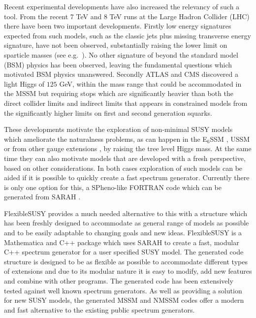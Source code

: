\documentclass[final,3p,11pt,pdflatex]{elsarticle}
\makeatletter
\newcommand{\sarah}{SARAH\@\xspace}
\newcommand{\fs}{FlexibleSUSY\@\xspace}
\newcommand{\mathematica}{Mathematica\xspace}
\newcommand{\ESSM}{E$_6$SSM\@\xspace}
\makeatother
\begin{document}
Recent experimental developments have also increased the relevancy of
such a tool. From the recent $7$ TeV and $8$ TeV runs at the Large
Hadron Collider (LHC) there have been two important developments.
Firstly low energy signatures expected from such models, such as the
classic jets plus missing transverse energy signature, have not been
observed, substantially raising the lower limit on sparticle masses
(see e.g.~\cite{Aad:2013wta,Chatrchyan:2014lfa}). No other signature
of beyond the standard model (BSM) physics has been observed, leaving
the fundamental questions which motivated BSM physics
unanswered. Secondly ATLAS and CMS discovered \cite{ATLAS:2012ae,
  Chatrchyan:2012tx} a light Higgs of $125$ GeV, within the mass range
that could be accommodated in the MSSM but requiring stops which are
significantly heavier than both the direct collider limits and
indirect limits that appears in constrained models from the
significantly higher limits on first and second generation squarks.

These developments motivate the exploration of non-minimal SUSY models
which ameliorate the naturalness problems, as can happen in the \ESSM
\cite{King:2005jy,King:2005my,King:2007uj,Athron:2010zz,Nevzorov:2012hs,Nevzorov:2013tta,Nevzorov:2013ixa}, USSM
\cite{Fayet:1977yc,Suematsu:1994qm,Cvetic:1995rj,deCarlos:1997yv,Cvetic:1997ky,Demir:1998dk,Langacker:1998tc,Erler:2002pr,Choi:2006fz,Ham:2007wc,Langacker:2008yv,Ham:2008xf,Kalinowski:2008iq} or from other gauge extensions \cite{Batra:2003nj, Medina:2009ey, Bharucha:2013ela}, 
by raising the tree level Higgs mass. At the same time they can also
motivate models that are developed with a fresh perspective, based on
other considerations.  In both cases exploration of such models can be
aided if it is possible to quickly create a fast spectrum generator.
Currently there is only one option for this, a SPheno-like FORTRAN
code which can be generated from \sarah
\cite{Staub:2010ty,Staub:2009bi,Staub:2010jh,Staub:2012pb,Staub:2013tta}.

\fs provides a much needed alternative to this with a structure which
has been freshly designed to accommodate as general range of models as
possible and to be easily adaptable to changing goals and new
ideas. \fs is a \mathematica and C++ package which uses \sarah to create a
fast, modular C++ spectrum generator for a user specified SUSY model.
The generated code structure is designed to be as flexible as possible
to accommodate different types of extensions and due to its modular
nature it is easy to modify, add new features and combine with other
programs.  The generated code has been extensively tested against well
known spectrum generators. As well as providing a solution for new
SUSY models, the generated MSSM and NMSSM codes offer a modern and fast
alternative to the existing public spectrum generators.
\end{document}
